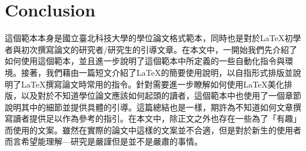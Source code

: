 \documentclass[12pt]{report}
\theoremstyle{plain}
\renewcommand{\schoolzh}{國立臺北科技大學}
\begin{document}
\chapter{Conclusion}

這個範本本身是\schoolzh{}的學位論文格式範本，同時也是對於\LaTeX{}初學者與初次撰寫論文的研究者/研究生的引導文章。在本文中，一開始我們先介紹了如何使用這個範本，並且進一步說明了這個範本中所定義的一些自動化指令與環境。接著，我們藉由一篇短文介紹了\LaTeX{}的簡要使用說明，以自指形式排版並說明了\LaTeX{}撰寫論文時常用的指令。針對需要進一步瞭解如何使用\LaTeX{}美化排版，以及對於不知道學位論文應該如何起頭的讀者，這個範本中也使用了一個章節說明其中的細節並提供具體的引導。這篇總結也是一樣，期許為不知道如何文章撰寫讀者提供足以作為參考的指引。在本文中，除正文之外也存在一些為了「有趣」而使用的文案。雖然在實際的論文中這樣的文案並不合適，但是對於新生的使用者而言希望能理解---研究是嚴謹但是並不是嚴肅的事情。

\clearpage
{}


\end{document}
